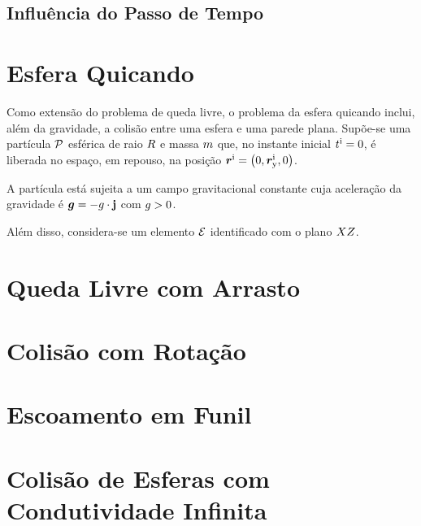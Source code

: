 \subsection{Influência do Passo de Tempo}

\section{Esfera Quicando}

Como extensão do problema de queda livre, o problema da esfera quicando inclui, além da gravidade, a colisão entre uma esfera e uma parede plana. Supõe-se uma partícula \(\mathcal{P}\) esférica de raio \(R\) e massa \(m\) que, no instante inicial \(t^{\text{i}}=0\), é liberada no espaço, em repouso, na posição \(\initial{\position} = \explicitVector{0}{\initial{\yComponent{\position}}}{0}\).

A partícula está sujeita a um campo gravitacional constante cuja aceleração da gravidade é \(\bm{g} = -g\cdot\mathbf{j}\) com \(g>0\). 

Além disso, considera-se um elemento \(\mathcal{E}\) identificado com o plano \(XZ\). \label{Continuar isso aqui}

\section{Queda Livre com Arrasto}
\section{Colisão com Rotação}
\section{Escoamento em Funil}
\section{Colisão de Esferas com Condutividade Infinita}
